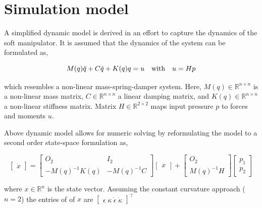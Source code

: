 


\section{Simulation model}

A simplified dynamic model is derived in an effort to capture the dynamics of the soft manipulator. It is assumed that the dynamics of the system can be formulated as, 

\begin{equation}
    M(q)\Ddot{q} + C\dot{q} + K(q)q = u \hspace{10pt} \text{with} \hspace{10pt} u = Hp
\end{equation}

which resembles a non-linear mass-spring-damper system. Here, $M(q)  \in \mathbb{R}^{n\times n}$ is a non-linear mass matrix, $C   \in \mathbb{R}^{n\times n}$ a linear damping matrix, and $K(q)   \in \mathbb{R}^{n\times n}$ a non-linear stiffness matrix. Matrix $H   \in \mathbb{R}^{2\times 2}$ maps input pressure $p$ to forces and moments $u$.

Above dynamic model allows for numeric solving by reformulating the model to a second order state-space formulation as,

\begin{equation}
     \begin{bmatrix} \dot{x}  \end{bmatrix}   =      \begin{bmatrix} O_2 & I_2 \\ -M(q)^{-1}K(q)  & -M(q)^{-1} C \end{bmatrix}      \begin{bmatrix} x \end{bmatrix}  +      \begin{bmatrix} O_2 \\ M(q)^{-1}H   \end{bmatrix}       \begin{bmatrix} p_1\\ p_2   \end{bmatrix} 
\end{equation}

where $x \in \mathbb{R}^{n}$ is the state vector. Assuming the constant curvature approach ($n = 2$) the entries of of $x$ are $ \begin{bmatrix} \epsilon \hspace{3pt} \kappa \hspace{3pt} \dot{\epsilon}  \hspace{3pt} \dot{\kappa}  \end{bmatrix}^{\top}  $



